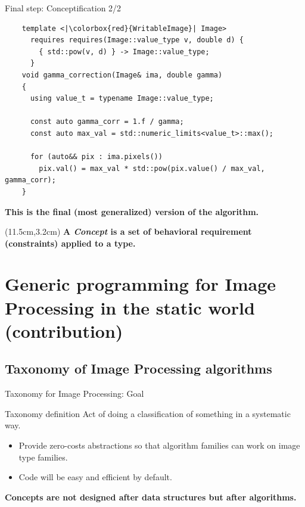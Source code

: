 \documentclass[12pt,aspectratio=169]{beamer}
\begin{document}
\begin{frame}[fragile]{Final step: Conceptification 2/2}
  \begin{verbatim}
    template <|\colorbox{red}{WritableImage}| Image>
      requires requires(Image::value_type v, double d) {
        { std::pow(v, d) } -> Image::value_type;
      }
    void gamma_correction(Image& ima, double gamma)
    {
      using value_t = typename Image::value_type;
    
      const auto gamma_corr = 1.f / gamma;
      const auto max_val = std::numeric_limits<value_t>::max();
    
      for (auto&& pix : ima.pixels())
        pix.val() = max_val * std::pow(pix.value() / max_val, gamma_corr);
    }
  \end{verbatim}
  \vfill
  \begin{center}\textbf{This is the final (most generalized) version of the algorithm.}\end{center}
  \begin{textblock*}{4cm}(11.5cm,3.2cm)
    \textbf{A \emph{Concept} is a set of behavioral requirement (constraints) applied to a type.}
  \end{textblock*}
\end{frame}

%
%
%
\section[Generic Programming for Image Processing in the static world (contribution)]{Generic programming for Image Processing in the static world (contribution)}

\subsection{Taxonomy of Image Processing algorithms}

\begin{frame}{Taxonomy for Image Processing: Goal}
  \begin{alertblock}{Taxonomy definition}
    Act of doing a classification of something in a systematic way.
  \end{alertblock}
  \begin{itemize}
    \item Provide zero-costs abstractions so that algorithm families can work on image type families.
    \item Code will be easy and efficient by default.
  \end{itemize}
  \begin{center}
    \textbf{Concepts are not designed after data structures but after algorithms.}
  \end{center}
\end{frame}
\end{document}
